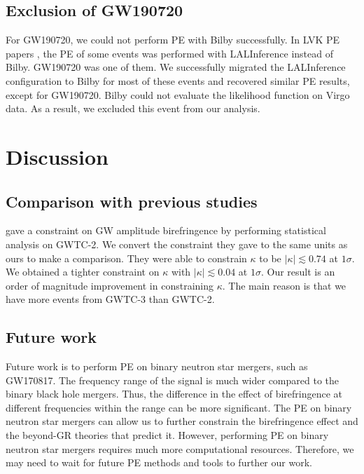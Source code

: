 \documentclass[aps,prd,twocolumn,superscriptaddress,preprintnumbers,floatfix,nofootinbib]{revtex4-2}
\begin{document}
\subsection{Exclusion of GW190720}
\label{sec:GW190720}
For GW190720, we could not perform PE with Bilby successfully.
In LVK PE papers \citep{GWTC-2.1, GWTC-3}, the PE of some events was performed with LALInference \citep{lalsuite} instead of Bilby.
GW190720 was one of them.
We successfully migrated the LALInference configuration to Bilby for most of these events and recovered similar PE results, except for GW190720.
Bilby could not evaluate the likelihood function on Virgo data.
As a result, we excluded this event from our analysis.

\section{Discussion}
\label{sec:Discussion}

\subsection{Comparison with previous studies}
\citet{Okounkova_2022} gave a constraint on GW amplitude birefringence by performing statistical analysis on GWTC-2.
We convert the constraint they gave to the same units as ours to make a comparison.
They were able to constrain $\kappa$ to be $|\kappa| \lesssim 0.74$ at $1 \sigma$.
We obtained a tighter constraint on $\kappa$ with $|\kappa| \lesssim 0.04$ at $1 \sigma$.
Our result is an order of magnitude improvement in constraining $\kappa$.
The main reason is that we have more events from GWTC-3 than GWTC-2.

\subsection{Future work}
Future work is to perform PE on binary neutron star mergers, such as GW170817.
The frequency range of the signal is much wider compared to the binary black hole mergers.
Thus, the difference in the effect of birefringence at different frequencies within the range can be more significant.
The PE on binary neutron star mergers can allow us to further constrain the birefringence effect and the beyond-GR theories that predict it.
However, performing PE on binary neutron star mergers requires much more computational resources.
Therefore, we may need to wait for future PE methods and tools to further our work.
\end{document}
